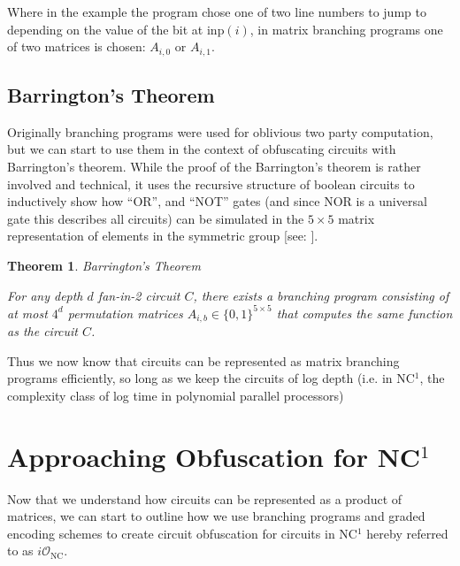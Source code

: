 \documentclass[12pt,twoside]{reedthesis}
\newtheorem{theorem}{Theorem}
\begin{document}
     \par Where in the example the program chose one of two line numbers to jump to depending on the value of the bit at inp$(i)$, in matrix branching programs one of two matrices is chosen: $A_{i,0}$ or $A_{i,1}$.
         
      
       
            
      \subsection{Barrington's Theorem}
      
       Originally branching programs were used for oblivious two party computation, but we can start to use them in the context of obfuscating circuits with Barrington's theorem. While the proof of the Barrington's theorem is rather involved and technical, it uses the recursive structure of boolean circuits to inductively show how ``OR'', and ``NOT'' gates (and since NOR is a universal gate this describes all circuits) can be simulated in the $5 \times 5$ matrix representation of elements in the symmetric group [see: \cite{Barrington:1986:BPB:12130.12131}].
      
      
      \begin{theorem}{Barrington's Theorem}
      \par For any depth $d$ fan-in-2 circuit $C$, there exists a branching program consisting of at most $4^d$ permutation matrices $A_{i,b}\in\{0,1\}^{5 \times 5}$ that computes the same function as the circuit $C$.
      \end{theorem}
      
      
    \par Thus we now know that circuits can be represented as matrix branching programs efficiently, so long as we keep the circuits of log depth (i.e. in NC$^1$, the complexity class of log time in polynomial parallel processors)
     
     \section{Approaching Obfuscation for NC$^1$}
     \newcommand{\inp}[0]{\text{inp}}
     
     Now that we understand how circuits can be represented as a product of matrices, we can start to outline how we use branching programs and graded encoding schemes to create circuit obfuscation for circuits in NC$^1$ hereby referred to as $i\mathcal{O}_\text{NC}$.
     
\end{document}
